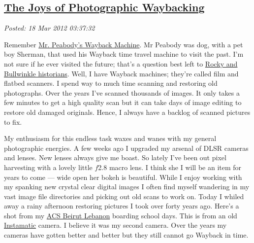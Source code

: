 %

\subsection*{\href{http://bakerjd99.wordpress.com/2012/03/17/the-joys-of-photographic-waybacking/}{The Joys of Photographic Waybacking}}


\noindent\emph{Posted: 18 Mar 2012 03:37:32}
\vspace{6pt}

Remember \href{http://www.youtube.com/watch?v=Kkqn7O1lHFI}{Mr. Peabody's
Wayback Machine}. Mr Peabody was dog, with a pet boy Sherman, that used
his Wayback time travel machine to visit the past. I'm not sure if he
ever visited the future; that's a question best left to
\href{http://www.berkeleyside.com/2009/12/22/berkeley-history-rocky-and-bullwinkle/}{Rocky
and Bullwinkle historians}. Well, I have Wayback machines; they're
called film and flatbed scanners. I spend way to much time scanning and
restoring old photographs. Over the years I've scanned thousands of
images. It only takes a few minutes to get a high quality scan but it
can take days of image editing to restore old damaged originals. Hence,
I always have a backlog of scanned pictures to fix.

My enthusiasm for this endless task waxes and wanes with my general
photographic energies. A few weeks ago I upgraded my arsenal of DLSR
cameras and lenses. New lenses always give me boast. So lately I've been
out pixel harvesting with a lovely little $f$2.8 macro lens. I think she I
will be an item for years to come --- wide open her bokeh is beautiful.
While I enjoy working with my spanking new crystal clear digital images
I often find myself wandering in my vast image file directories and picking
out old scans to work on. Today I whiled away a rainy afternoon
restoring pictures I took over forty years ago. Here's a shot from my
\href{http://en.wikipedia.org/wiki/American\_Community\_School\_at\_Beirut}{ACS
Beirut Lebanon} boarding school days. This is from an old
\href{http://camerapedia.wikia.com/wiki/Instamatic}{Instamatic} camera. I
believe it was my second camera. Over the years my cameras have gotten
better and better but they still cannot go Wayback in time.



